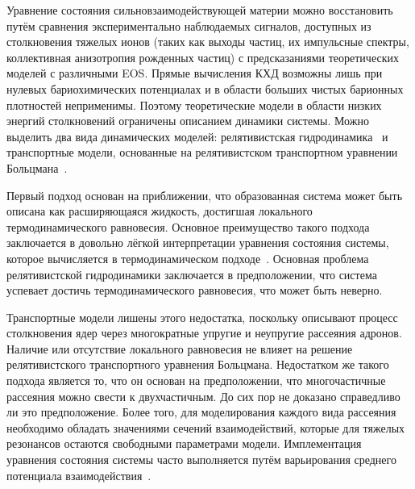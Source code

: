 Уравнение состояния сильновзаимодействующей материи можно восстановить путём сравнения экспериментально наблюдаемых сигналов, доступных из столкновения тяжелых ионов (таких как выходы частиц, их импульсные спектры, коллективная анизотропия рожденных частиц) с предсказаниями теоретических моделей с различными EOS.
Прямые вычисления КХД возможны лишь при нулевых бариохимических потенциалах и в области больших чистых барионных плотностей неприменимы.
Поэтому теоретические модели в области низких энергий столкновений ограничены описанием динамики системы.
Можно выделить два вида динамических моделей: релятивистская гидродинамика~\cite{Stoecker:1986ci,Hung:1994eq,Werner:2010aa} и транспортные модели, основанные на релятивистском транспортном уравнении Больцмана~\cite{Molnar:2004yh,Xu:2004mz}.

Первый подход основан на приближении, что образованная система может быть описана как расширяющаяся жидкость, достигшая локального термодинамического равновесия. 
Основное преимущество такого подхода заключается в довольно лёгкой интерпретации уравнения состояния системы, которое вычисляется в термодинамическом подходе~\cite{Stoecker:1986ci}.
Основная проблема релятивистской гидродинамики заключается в предположении, что система успевает достичь термодинамического равновесия, что может быть неверно.

Транспортные модели лишены этого недостатка, поскольку описывают процесс столкновения ядер через многократные упругие и неупругие рассеяния адронов.
Наличие или отсутствие локального равновесия не влияет на решение релятивистского транспортного уравнения Больцмана.
Недостатком же такого подхода является то, что он основан на предположении, что многочастичные рассеяния можно свести к двухчастичным.
До сих пор не доказано справедливо ли это предположение.
Более того, для моделирования каждого вида рассеяния необходимо обладать значениями сечений взаимодействий, которые для тяжелых резонансов остаются свободными параметрами модели.
Имплементация уравнения состояния системы часто выполняется путём варьирования среднего потенциала взаимодействия~\cite{Nara:2016hbg}.

